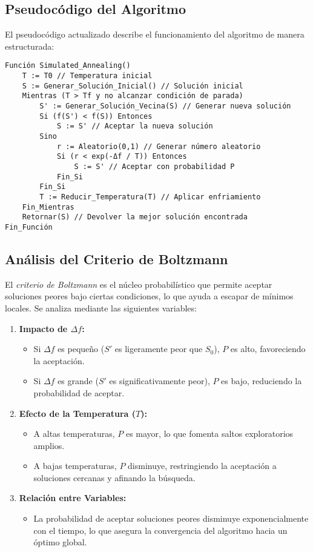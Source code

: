 \documentclass{article}
\begin{document}
\subsection{Pseudocódigo del Algoritmo}
El pseudocódigo actualizado describe el funcionamiento del algoritmo de manera estructurada:

\begin{verbatim}
Función Simulated_Annealing()
    T := T0 // Temperatura inicial
    S := Generar_Solución_Inicial() // Solución inicial
    Mientras (T > Tf y no alcanzar condición de parada)
        S' := Generar_Solución_Vecina(S) // Generar nueva solución
        Si (f(S') < f(S)) Entonces
            S := S' // Aceptar la nueva solución
        Sino
            r := Aleatorio(0,1) // Generar número aleatorio
            Si (r < exp(-Δf / T)) Entonces
                S := S' // Aceptar con probabilidad P
            Fin_Si
        Fin_Si
        T := Reducir_Temperatura(T) // Aplicar enfriamiento
    Fin_Mientras
    Retornar(S) // Devolver la mejor solución encontrada
Fin_Función
\end{verbatim}

\subsection{Análisis del Criterio de Boltzmann}

El \textit{criterio de Boltzmann} es el núcleo probabilístico que permite aceptar soluciones peores bajo ciertas condiciones, lo que ayuda a escapar de mínimos locales. Se analiza mediante las siguientes variables:

\begin{enumerate}
    \item \textbf{Impacto de $\Delta f$:}
    \begin{itemize}
        \item Si $\Delta f$ es pequeño ($S'$ es ligeramente peor que $S_0$), $P$ es alto, favoreciendo la aceptación.
        \item Si $\Delta f$ es grande ($S'$ es significativamente peor), $P$ es bajo, reduciendo la probabilidad de aceptar.
    \end{itemize}
    
    \item \textbf{Efecto de la Temperatura ($T$):}
    \begin{itemize}
        \item A altas temperaturas, $P$ es mayor, lo que fomenta saltos exploratorios amplios.
        \item A bajas temperaturas, $P$ disminuye, restringiendo la aceptación a soluciones cercanas y afinando la búsqueda.
    \end{itemize}
    
    \item \textbf{Relación entre Variables:}
    \begin{itemize}
        \item La probabilidad de aceptar soluciones peores disminuye exponencialmente con el tiempo, lo que asegura la convergencia del algoritmo hacia un óptimo global.
    \end{itemize}
\end{enumerate}
\end{document}
